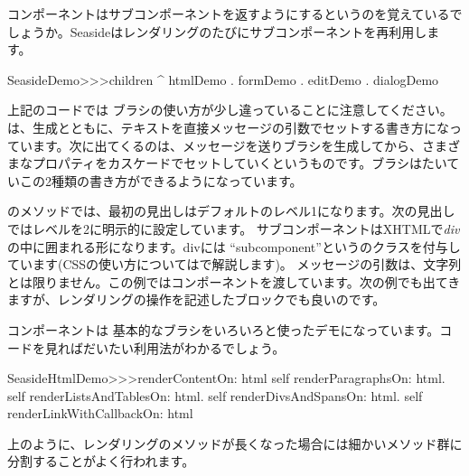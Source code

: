 \documentclass[a4paper,10pt,twoside]{book}
\begin{document}
{{\noindent
コンポーネントはサブコンポーネントを返すようにするというのを覚えているでしょうか。Seasideはレンダリングのたびにサブコンポーネントを再利用します。
\begin{code}{}
SeasideDemo>>>children
	^ { htmlDemo . formDemo . editDemo . dialogDemo }
\end{code}

上記のコードでは  ブラシの使い方が少し違っていることに注意してください。は、生成とともに、テキストを直接メッセージの引数でセットする書き方になっています。次に出てくるのは、メッセージを送りブラシを生成してから、さまざまなプロパティをカスケードでセットしていくというものです。ブラシはたいていこの2種類の書き方ができるようになっています。


のメソッドでは、最初の見出しはデフォルトのレベル1になります。次の見出しではレベルを2に明示的に設定しています。
 サブコンポーネントはXHTMLで\emph{div}の中に囲まれる形になります。divには ``subcomponent''というのクラスを付与しています(CSSの使い方についてはで解説します)。   メッセージの引数は、文字列とは限りません。この例ではコンポーネントを渡しています。次の例でも出てきますが、レンダリングの操作を記述したブロックでも良いのです。

コンポーネントは 基本的なブラシをいろいろと使ったデモになっています。コードを見ればだいたい利用法がわかるでしょう。

\begin{code}{}
SeasideHtmlDemo>>>renderContentOn: html 
	self renderParagraphsOn: html.
	self renderListsAndTablesOn: html.
	self renderDivsAndSpansOn: html.
	self renderLinkWithCallbackOn: html
\end{code}

上のように、レンダリングのメソッドが長くなった場合には細かいメソッド群に分割することがよく行われます。


}}
\end{document}
